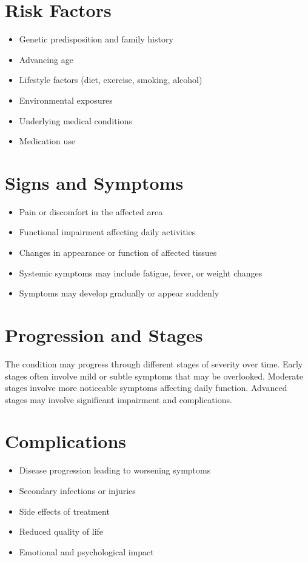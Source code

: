 \section{Risk Factors}
\begin{itemize}[noitemsep]
  \item Genetic predisposition and family history
  \item Advancing age
  \item Lifestyle factors (diet, exercise, smoking, alcohol)
  \item Environmental exposures
  \item Underlying medical conditions
  \item Medication use
\end{itemize}
\section{Signs and Symptoms}
\begin{itemize}[noitemsep]
  \item Pain or discomfort in the affected area
  \item Functional impairment affecting daily activities
  \item Changes in appearance or function of affected tissues
  \item Systemic symptoms may include fatigue, fever, or weight changes
  \item Symptoms may develop gradually or appear suddenly
\end{itemize}
\section{Progression and Stages}
The condition may progress through different stages of severity over time. Early stages often involve mild or subtle symptoms that may be overlooked. Moderate stages involve more noticeable symptoms affecting daily function. Advanced stages may involve significant impairment and complications.
\section{Complications}
\begin{itemize}[noitemsep]
  \item Disease progression leading to worsening symptoms
  \item Secondary infections or injuries
  \item Side effects of treatment
  \item Reduced quality of life
  \item Emotional and psychological impact
\end{itemize}
